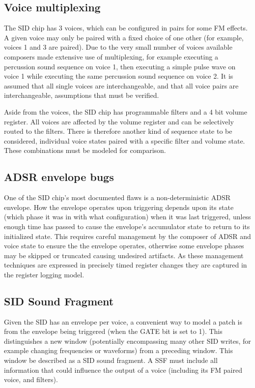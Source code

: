 \documentclass[10pt]{article}
\begin{document}
\begin{multicols*}{2}
  \subsection{Voice multiplexing}
  The SID chip has 3 voices, which can be configured in pairs for some
  FM effects. A given voice may only be paired with a fixed choice of
  one other (for example, voices 1 and 3 are paired). Due to the very
  small number of voices available composers made extensive use of
  multiplexing, for example executing a percussion sound sequence on
  voice 1, then executing a simple pulse wave on voice 1 while
  executing the same percussion sound sequence on voice 2. It is
  assumed that all single voices are interchangeable, and that all
  voice pairs are interchangeable, assumptions that must be verified.

  Aside from the voices, the SID chip has programmable filters and a 4
  bit volume register. All voices are affected by the volume register
  and can be selectively routed to the filters. There is therefore
  another kind of sequence state to be considered, individual voice
  states paired with a specific filter and volume state. These
  combinations must be modeled for comparison.

  \subsection{ADSR envelope bugs}
  One of the SID chip's most documented flaws is a non-deterministic
  ADSR envelope. How the envelope operates upon triggering depends
  upon its state (which phase it was in with what configuration) when
  it was last triggered, unless enough time has passed to cause the
  envelope's accumulator state to return to its initialized state.
  This requires careful management by the composer of ADSR and voice
  state to ensure the the envelope operates, otherwise some envelope
  phases may be skipped or truncated causing undesired artifacts. As
  these management techniques are expressed in precisely timed
  register changes they are captured in the register logging model.

  \subsection{SID Sound Fragment}
  Given the SID has an envelope per voice, a convenient way to model
  a patch is from the envelope being triggered (when the GATE bit
  is set to 1). This distinguishes a new window (potentially encompassing
  many other SID writes, for example changing frequencies or
  waveforms) from a preceding window. This window be described
  as a SID sound fragment. A SSF must include all information
  that could influence the output of a voice (including its
  FM paired voice, and filters).


\end{multicols*}
\end{document}
